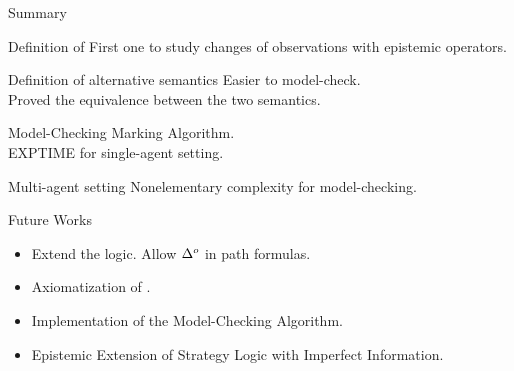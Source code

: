 \begin{frame}{Summary}

  \begin{exampleblock}{Definition of \ctlskd}
    First one to study changes of observations with epistemic operators.
  \end{exampleblock}
  \vfill
  \begin{exampleblock}{Definition of alternative semantics}
    Easier to model-check.\\
    Proved the equivalence between the two semantics.
  \end{exampleblock}
  \vfill
  \begin{exampleblock}{Model-Checking}
    Marking Algorithm.\\
    EXPTIME for single-agent setting.
  \end{exampleblock}
  \vfill
  \begin{exampleblock}{Multi-agent setting}
    Nonelementary complexity for model-checking.
  \end{exampleblock}
   
\end{frame}


\begin{frame}{Future Works}

  \begin{itemize}
  \item Extend the logic. Allow $\Delta^{o}$ in path formulas.
  \item Axiomatization of \ctlskd.
  \item Implementation of the Model-Checking Algorithm.
  \item Epistemic Extension of Strategy Logic with Imperfect Information.
  \end{itemize}
  
\end{frame}
